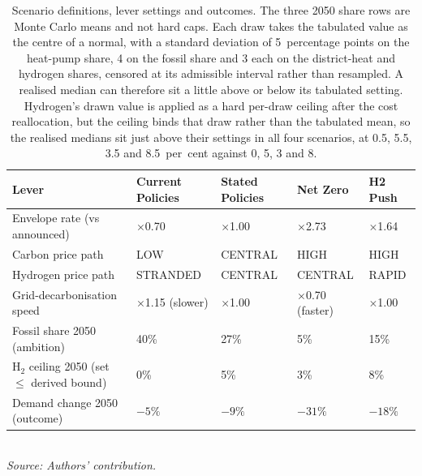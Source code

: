 \begin{table}[H]
\centering
\caption{Scenario definitions, lever settings and outcomes. The three 2050 share rows are Monte Carlo means and not hard caps. Each draw takes the tabulated value as the centre of a normal, with a standard deviation of 5~percentage points on the heat-pump share, 4 on the fossil share and 3 each on the district-heat and hydrogen shares, censored at its admissible interval rather than resampled. A realised median can therefore sit a little above or below its tabulated setting. Hydrogen's drawn value is applied as a hard per-draw ceiling after the cost reallocation, but the ceiling binds that draw rather than the tabulated mean, so the realised medians sit just above their settings in all four scenarios, at 0.5, 5.5, 3.5 and 8.5~per~cent against 0, 5, 3 and 8.}
\label{tab:scenarios}
\small
\begin{tabularx}{\textwidth}{lXXXX}
\toprule
Lever & Current Policies & Stated Policies & Net Zero & H2 Push \\
\midrule
Envelope rate (vs announced)  & $\times$0.70 & $\times$1.00 & $\times$2.73 & $\times$1.64 \\
Carbon price path             & LOW          & CENTRAL      & HIGH         & HIGH    \\
Hydrogen price path           & STRANDED     & CENTRAL      & CENTRAL      & RAPID \\
Grid-decarbonisation speed    & $\times$1.15 (slower) & $\times$1.00 & $\times$0.70 (faster) & $\times$1.00 \\
Fossil share 2050 (ambition)  & 40\%         & 27\%         & 5\%          & 15\% \\
H$_2$ ceiling 2050 (set $\leq$ derived bound) & 0\% & 5\% & 3\% & 8\% \\
\midrule
Demand change 2050 (outcome)  & $-5\%$       & $-9\%$       & $-31\%$      & $-18\%$ \\
\bottomrule
\end{tabularx}
\\[8pt]{\footnotesize\textit{Source: Authors' contribution.}}
\end{table}

